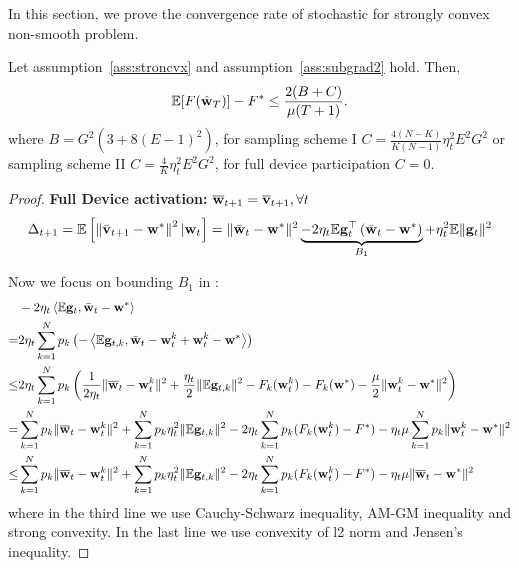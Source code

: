 
In this section, we prove the convergence rate of stochastic for strongly convex
non-smooth problem.


\begin{theorem}
	Let assumption~\ref{ass:stroncvx} and assumption~\ref{ass:subgrad2} hold. Then,
	\begin{align}
		\mathbb{E}[F(\hat{{\mathbf{w}}}_T)] - F^* \leq \frac{2(B + C)}{\mu(T+1)}.
	\end{align}
	where $B =  G^2 (3  + 8 (E-1)^2)$, for sampling scheme I $C =\frac{4(N - K)}{K(N-1)} \eta_t^2 E^2G^2 $ or
sampling scheme II $C = \frac{4}{K} \eta_t^2 E^2G^2$, for full device participation $C= 0$.
\end{theorem}


\begin{proof}

\textbf{Full Device activation: }  ${\overline{\mathbf{w}}}_{t+1} = {\overline{\mathbf{v}}}_{t+1}, \forall t$ 
\begin{align}
\Delta_{t+1} = \mathbb{E}\left[\left\|\bar{{\mathbf{v}}}_{t+1}-{\mathbf{w}}^{*}\right\|^2| {\mathbf{w}}_{t}\right]=\|\bar{{\mathbf{w}}}_{t}-{\mathbf{w}}^{*}\|^{2} \underbrace{ - 2 \eta_{t} \mathbb{E} {\mathbf{g}}_{t}^{\top}\left(\bar{{\mathbf{w}}}_{t}-{\mathbf{w}}^{*}\right)}_{B_1} + \eta_{t}^{2} \mathbb{E}\| {\mathbf{g}}_{t} \|^{2}	
\label{eq:expand2}
\end{align}


Now we focus on bounding $B_1$ in \eq{\ref{eq:expand}}: 
\begin{align}
	& -2 \eta_{t} \left<\mathbb{E} {\mathbf{g}}_{t}, \bar{{\mathbf{w}}}_{t}-{\mathbf{w}}^{*} \right>\\
  = & 2 \eta_{t} \sum_{k=1}^N p_k \left(-\left<\mathbb{E} {\mathbf{g}}_{t,k}, \bar{{\mathbf{w}}}_{t}-{\mathbf{w}}_t^k + {\mathbf{w}}_t^k - {\mathbf{w}}^{*} \right> \right) \\
  \leq& 2 \eta_{t} \sum_{k=1}^N p_k  \left(\frac{1}{2\eta_t} \|\overline{{\mathbf{w}}}_t - {\mathbf{w}}_t^k\|^2 + \frac{\eta_t}{2} \|\mathbb{E} {\mathbf{g}}_{t,k}\|^2 - F_k({\mathbf{w}}_t^k) - F_k({\mathbf{w}}^*) - \frac{\mu}{2} \|{\mathbf{w}}_t^k - {\mathbf{w}}^*\|^2 \right) \\
  =& \sum_{k=1}^N p_k \|\overline{{\mathbf{w}}}_t - {\mathbf{w}}_t^k\|^2 +  \sum_{k=1}^N p_k \eta_t^2 \|\mathbb{E} {\mathbf{g}}_{t,k}\|^2 
  - 2\eta_t\sum_{k=1}^N p_k (F_k({\mathbf{w}}_t^k) - F^*) - \eta_t \mu \sum_{k=1}^N p_k \|{\mathbf{w}}_t^k - {\mathbf{w}}^*\|^2 \\
  \leq & \sum_{k=1}^N p_k \|\overline{{\mathbf{w}}}_t - {\mathbf{w}}_t^k\|^2 +  \sum_{k=1}^N p_k \eta_t^2 \|\mathbb{E} {\mathbf{g}}_{t,k}\|^2 
  - 2\eta_t\sum_{k=1}^N p_k (F_k({\mathbf{w}}_t^k) - F^*) - \eta_t \mu \|{\overline{\mathbf{w}}}_t- {\mathbf{w}}^*\|^2  \label{eq:scvxnsmth1}
\end{align}
where in the third line we use Cauchy-Schwarz inequality, AM-GM inequality and strong convexity.
In the last line we use convexity of l2 norm and Jensen's inequality.


\end{proof}
